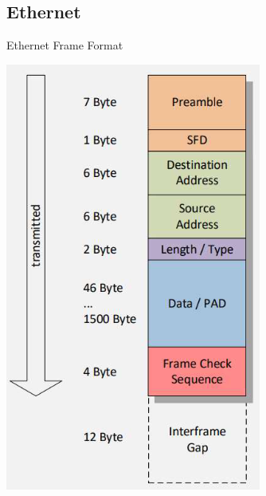 \subsection*{Ethernet}

\begin{definition}{Ethernet Frame Format}\\
    \begin{minipage}{0.3\linewidth}
        \includegraphics[width=1\linewidth]{images/ethernet_format.png}
    \end{minipage}
    \begin{minipage}{0.7\linewidth}

\end{minipage}
\end{definition}
